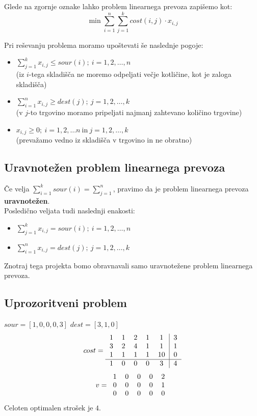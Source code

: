 \documentclass[12pt,a4paper,twoside]{article}
\theoremstyle{definition} %
\theoremstyle{plain} %
\numberwithin{equation}{section}  %
\begin{document}
\noindent Glede na zgornje oznake lahko problem linearnega prevoza zapišemo kot:
$$\min \sum\limits_{i=1}^{n} \sum\limits_{j=1}^{k} cost(i,j) \cdot x_{i,j}$$

\noindent Pri reševanju problema moramo upoštevati še naslednje pogoje:
\begin{itemize}
\item $\sum\limits_{j=1}^{k} x_{i,j} \leq sour(i);~ i=1,2,\dots,n$ \\ (iz $i$-tega skladišča ne moremo odpeljati večje kotličine, kot je zaloga skladišča)
\item $\sum\limits_{i=1}^{n} x_{i,j} \geq dest(j);~ j=1,2,\dots,k$ \\ (v $j$-to trgovino moramo pripeljati najmanj zahtevano količino trgovine)
\item $x_{i,j} \geq 0;~ i=1,2, \dots n ~ \text{in} ~ j=1,2, \dots, k$ \\
(prevažamo vedno iz skladišča v trgovino in ne obratno)
\end{itemize}

\newpage
\subsection{Uravnotežen problem linearnega prevoza}

Če velja $\sum\limits_{i=1}^{k} sour(i) = \sum\limits_{j=1}^{n}$, pravimo da je problem linearnega prevoza \textbf{uravnotežen}. \\

\noindent Posledično veljata tudi naslednji enakosti:
\begin{itemize}
\item $\sum\limits_{j=1}^{k} x_{i,j} = sour(i);~ i=1,2,\dots,n$ 
\item $\sum\limits_{i=1}^{n} x_{i,j} = dest(j);~ j=1,2,\dots,k$
\end{itemize}

 \noindent Znotraj tega projekta bomo obravnavali samo uravnotežene problem linearnega prevoza.

\subsection{Uprozoritveni problem}
$sour = [1, 0, 0, 0, 3]$
$dest = [3, 1, 0]$
$$ cost = 
\begin{tabular}{c c c c c | r}
 1 & 1 & 2 & 1 & 1 & 3\\
 3 & 2 & 4 & 1 & 1 & 1\\
 1 & 1 & 1 & 1 & 10& 0\\
 \hline
  1 & 0 & 0 & 0 & 3 & 4\\
\end{tabular}
$$
$$ v =
\begin{tabular}{c c c c c}
 1 & 0 & 0 & 0 & 2\\
 0 & 0 & 0 & 0 & 1\\
 0 & 0 & 0 & 0 & 0\\
 \end{tabular}
 $$
 Celoten optimalen strošek je $4$.
\end{document}
